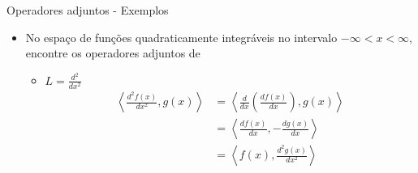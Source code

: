       \begin{slide}[toc=]{Operadores adjuntos - Exemplos}
	      \begin{itemize}
		      \item No espaço de funções quadraticamente integráveis no intervalo $-\infty < x <\infty$, encontre os operadores adjuntos de 
			      \begin{itemize}
				      \item $L = \frac{d^2}{dx^2}$
					      \begin{align*}
						      \left < \frac{d^2f(x)}{dx^2},g(x)\right > &= \left < \frac{d}{dx}\left (\frac{df(x)}{dx}\right ),g(x)\right >\\
						                                                &= \left < \frac{df(x)}{dx},-\frac{dg(x)}{dx}\right >\\
												&= \left < f(x),\frac{d^2g(x)}{dx^2}\right >
					      \end{align*}
			      \end{itemize}
	      \end{itemize}
      \end{slide}
      
